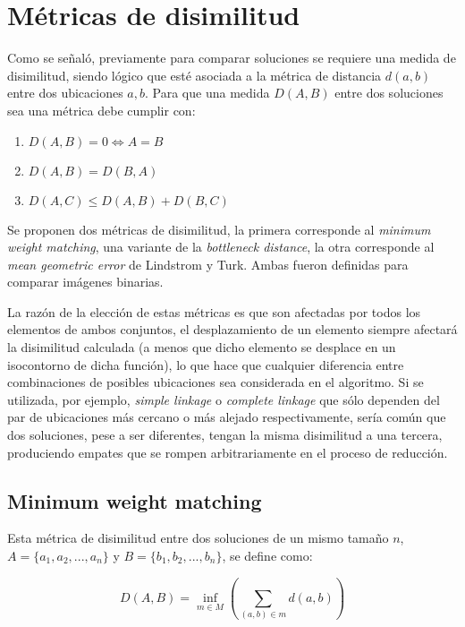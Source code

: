\section{Métricas de disimilitud}
\label{metricas_disimilitud}

Como se señaló, previamente para comparar soluciones se requiere una medida de disimilitud, siendo lógico que esté asociada a la métrica de distancia $d(a,b)$ entre dos ubicaciones $a,b$. Para que una medida $D(A,B)$ entre dos soluciones sea una métrica debe cumplir con:

\begin{enumerate}
\item $D(A,B) = 0 \Leftrightarrow A=B$
\item $D(A,B) = D(B,A)$
\item $D(A,C) \leq D(A,B) + D(B,C)$
\end{enumerate}

Se proponen dos métricas de disimilitud, la primera corresponde al \emph{minimum weight matching}, una variante de la \emph{bottleneck distance}, la otra corresponde al \emph{mean geometric error} de Lindstrom y Turk. Ambas fueron definidas para comparar imágenes binarias.

La razón de la elección de estas métricas es que son afectadas por todos los elementos de ambos conjuntos, el desplazamiento de un elemento siempre afectará la disimilitud calculada (a menos que dicho elemento se desplace en un isocontorno de dicha función), lo que hace que cualquier diferencia entre combinaciones de posibles ubicaciones sea considerada en el algoritmo. Si se utilizada, por ejemplo, \emph{simple linkage} o \emph{complete linkage} que sólo dependen del par de ubicaciones más cercano o más alejado respectivamente, sería común que dos soluciones, pese a ser diferentes, tengan la misma disimilitud a una tercera, produciendo empates que se rompen arbitrariamente en el proceso de reducción.

\subsection{Minimum weight matching}

Esta métrica de disimilitud entre dos soluciones de un mismo tamaño $n$, $A = \{a_1,a_2,...,a_n\}$ y $B = \{b_1,b_2,...,b_n\}$, se define como:

\begin{equation}
D(A,B) = \inf_{m \in M}\left( \sum_{(a,b) \in m} d(a,b)\right)
\end{equation}

